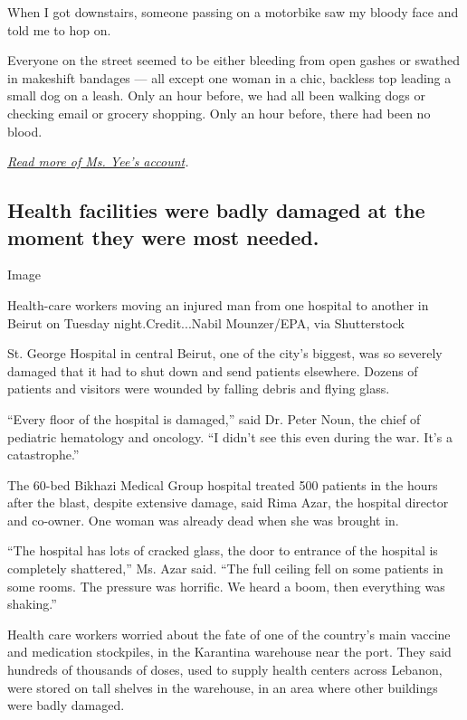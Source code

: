 When I got downstairs, someone passing on a motorbike saw my bloody face
and told me to hop on.

Everyone on the street seemed to be either bleeding from open gashes or
swathed in makeshift bandages --- all except one woman in a chic,
backless top leading a small dog on a leash. Only an hour before, we had
all been walking dogs or checking email or grocery shopping. Only an
hour before, there had been no blood.

\href{https://www.nytimes3xbfgragh.onion/2020/08/04/world/middleeast/beirut-explosion-first-person.html}{\emph{Read
more of Ms. Yee's account}}\emph{.}

\hypertarget{health-facilities-were-badly-damaged-at-the-moment-they-were-most-needed}{%
\subsection{Health facilities were badly damaged at the moment they were
most
needed.}\label{health-facilities-were-badly-damaged-at-the-moment-they-were-most-needed}}

Image

Health-care workers moving an injured man from one hospital to another
in Beirut on Tuesday night.Credit...Nabil Mounzer/EPA, via Shutterstock

St. George Hospital in central Beirut, one of the city's biggest, was so
severely damaged that it had to shut down and send patients elsewhere.
Dozens of patients and visitors were wounded by falling debris and
flying glass.

``Every floor of the hospital is damaged,'' said Dr. Peter Noun, the
chief of pediatric hematology and oncology. ``I didn't see this even
during the war. It's a catastrophe.''

The 60-bed Bikhazi Medical Group hospital treated 500 patients in the
hours after the blast, despite extensive damage, said Rima Azar, the
hospital director and co-owner. One woman was already dead when she was
brought in.

``The hospital has lots of cracked glass, the door to entrance of the
hospital is completely shattered,'' Ms. Azar said. ``The full ceiling
fell on some patients in some rooms. The pressure was horrific. We heard
a boom, then everything was shaking.''

Health care workers worried about the fate of one of the country's main
vaccine and medication stockpiles, in the Karantina warehouse near the
port. They said hundreds of thousands of doses, used to supply health
centers across Lebanon, were stored on tall shelves in the warehouse, in
an area where other buildings were badly damaged.

